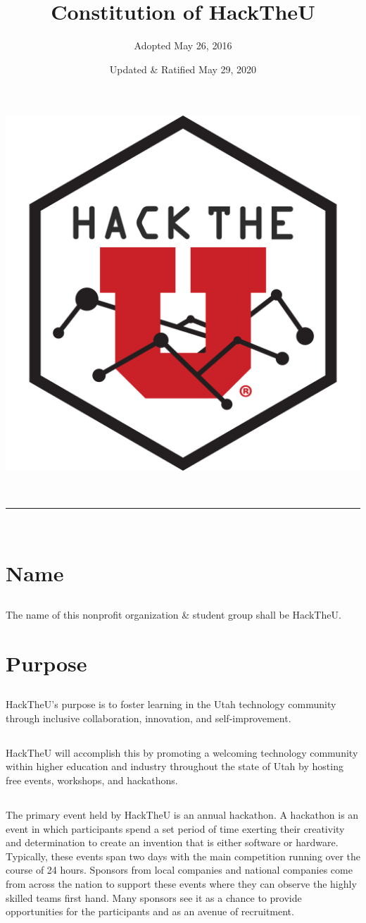 \documentclass[12pt]{article}
\title{Constitution of HackTheU}
\author{Adopted May 26, 2016}
\date{Updated \& Ratified May 29, 2020}
\makeatletter
\newcommand{\linia}{\rule{\linewidth}{0.5pt}}
\renewcommand{\maketitle}{
\begin{center}
\vspace{2ex}
{\huge \textsc{\@title}}
\vspace{1ex}
\\
\linia\\
\@author \hfill \@date
\vspace{4ex}
\end{center}
}
\makeatother
\begin{document}
\begin{center}
\includegraphics[width=.3\linewidth]{emblem}
\end{center}

\maketitle

\section{Name}

\subsection{}
The name of this nonprofit organization \& student group shall be HackTheU.

\section{Purpose}

\subsection{} HackTheU's purpose is to foster learning in the Utah technology community through inclusive collaboration, innovation, and self-improvement.

\subsection{} HackTheU will accomplish this by promoting a welcoming technology community 
within higher education and industry throughout the state of Utah 
by hosting free events, workshops, and hackathons.

\subsection{} The primary event held by HackTheU is an annual hackathon.
A hackathon is an event in which participants spend a set period of time exerting their creativity and determination to create an invention that is either software or hardware.
Typically, these events span two days with the main competition running over the course of 24 hours.
Sponsors from local companies and national companies come from across the nation to support these events
where they can observe the highly skilled teams first hand.
Many sponsors see it as a chance to provide opportunities for the participants and as an avenue of recruitment.
\end{document}
